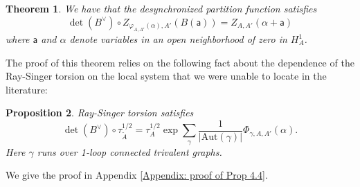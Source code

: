 \documentclass[11pt,a4paper]{amsart}
\theoremstyle{plain} %
\newtheorem{thm}{Theorem}[section]
\newtheorem{prop}[thm]{Proposition}
\theoremstyle{definition}
\theoremstyle{remark}
\newcommand{\mr}{\mathrm}
\newcommand{\sfa}{\mathsf{a}}
\newcommand{\til}{\widetilde}
\newcommand{\la}{\leftarrow}
\newcommand{\BB}{\mathfrak{B}}
\begin{document}
{\begin{thm}\label{thm 4.2}
We have that
the desynchronized partition function satisfies 
        \begin{equation}\label{eq thm 4.2}
            \det(B^\vee) \circ Z_{\varphi_{A,A'}(\alpha),A'}(B(\sfa)) = Z_{A,A'}(\alpha + \sfa) %
        \end{equation}
       where 
         $\sfa$ and $\alpha$ denote variables  in an open neighborhood of zero in $H^1_{A}$. 
\end{thm}
The proof of this theorem relies on the following fact about the dependence of the Ray-Singer torsion on the local system that we were unable to locate in the literature:  
\begin{prop}\label{prop: tau Grothendieck horizontality}
Ray-Singer torsion satisfies
\begin{equation}\label{tau G horizontality}
  \det(B^\vee)\circ \tau_{\til{A}}^{1/2}=\tau_{A}^{1/2} \exp \sum_{\gamma} \frac{1}{|\mr{Aut}(\gamma)|}\Phi_{\gamma,A,A'}(\alpha).
\end{equation}
    Here $\gamma$ runs over 1-loop connected trivalent graphs.
\end{prop}
We give the proof in Appendix \ref{Appendix: proof of Prop 4.4}.

}
\end{document}
